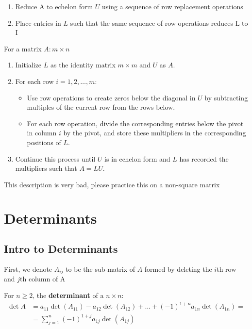 \documentclass{report}
\begin{document}
\begin{tcolorbox}[colback=blue!5!white, colframe=blue!75!black, title=LU Factorization Algorithm (boring)]
\begin{enumerate}
    \item Reduce A to echelon form $U$ using a sequence of row replacement operations
    \item Place entries in $L$ such that the same sequence of row operations reduces L to I
\end{enumerate}
\end{tcolorbox}

\begin{tcolorbox}[colback=blue!5!white, colframe=yellow!75!black, title=LU Factorization Algorithm (fast)]
For a matrix $A: m \times n$
\begin{enumerate}
    \item Initialize $L$ as the identity matrix $m \times m$ and $U$ as $A$.
    \item For each row $i = 1, 2, \dots, m$:
    \begin{itemize}
        \item Use row operations to create zeros below the diagonal in $U$ by subtracting multiples of the current row from the rows below.
        \item For each row operation, divide the corresponding entries below the pivot in column $i$ by the pivot, and store these multipliers in the corresponding positions of $L$.
    \end{itemize}
    \item Continue this process until $U$ is in echelon form and $L$ has recorded the multipliers such that $A = LU$.
\end{enumerate}
\end{tcolorbox}
This description is very bad, please practice this on a non-square matrix

\chapter{Determinants}
\section{Intro to Determinants}
\setcounter{theorem}{0}
\setcounter{definition}{0}

First, we denote $A_{ij}$ to be the sub-matrix of $A$ formed by deleting the $i$th row and $j$th column of A

\begin{definition}
For $n \ge 2$, the \textbf{determinant} of a $n \times n$: \[
\begin{array}{rlr}
    \det A &= a_{11} \det(A_{11}) - a_{12} \det(A_{12}) + \ldots + (-1)^{1+n} a_{1n} \det(A_{1n}) = \\
    &= \sum_{j = 1}^{n}(-1)^{1+j}a_{1j}\det(A_{1j})
\end{array}
\]
\end{definition}
\end{document}
